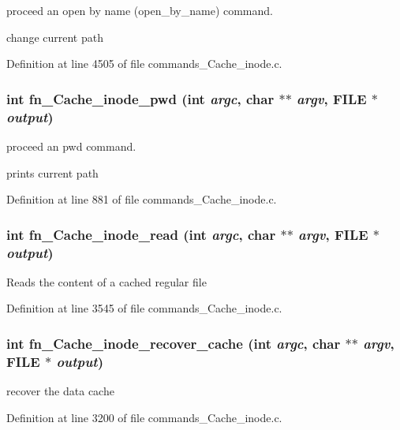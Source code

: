 proceed an open by name (open\_\-by\_\-name) command.

change current path 

Definition at line 4505 of file commands\_\-Cache\_\-inode.c.
\subsubsection[{fn\_\-Cache\_\-inode\_\-pwd}]{\setlength{\rightskip}{0pt plus 5cm}int fn\_\-Cache\_\-inode\_\-pwd (int {\em argc}, \/  char $\ast$$\ast$ {\em argv}, \/  FILE $\ast$ {\em output})}\label{commands_8h_aeb47365ab7e7c924c2a6caf763e818f}


proceed an pwd command.

prints current path 

Definition at line 881 of file commands\_\-Cache\_\-inode.c.
\subsubsection[{fn\_\-Cache\_\-inode\_\-read}]{\setlength{\rightskip}{0pt plus 5cm}int fn\_\-Cache\_\-inode\_\-read (int {\em argc}, \/  char $\ast$$\ast$ {\em argv}, \/  FILE $\ast$ {\em output})}\label{commands_8h_83f4bb6a3477931a870a2c45d5e1aa28}


Reads the content of a cached regular file 

Definition at line 3545 of file commands\_\-Cache\_\-inode.c.
\subsubsection[{fn\_\-Cache\_\-inode\_\-recover\_\-cache}]{\setlength{\rightskip}{0pt plus 5cm}int fn\_\-Cache\_\-inode\_\-recover\_\-cache (int {\em argc}, \/  char $\ast$$\ast$ {\em argv}, \/  FILE $\ast$ {\em output})}\label{commands_8h_88f63b3c17722d4912113b8ecf0b247b}


recover the data cache 

Definition at line 3200 of file commands\_\-Cache\_\-inode.c.
